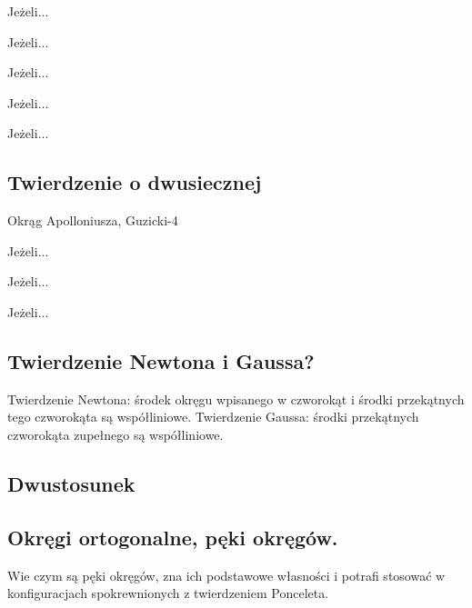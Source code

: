 \begin{definition}
	Jeżeli...
\end{definition}
\begin{proposition}
	Jeżeli...
\end{proposition}
\begin{definition}[oś potęgowa]
	Jeżeli...
\end{definition}
\begin{theorem}[Monge'a]
	Jeżeli...
\end{theorem}
\begin{theorem}[Auberta]
	Jeżeli...
\end{theorem}


\subsection{Twierdzenie o dwusiecznej}
Okrąg Apolloniusza, Guzicki-4

\begin{proposition}
	Jeżeli...
\end{proposition}
\begin{theorem}
	Jeżeli...
\end{theorem}
\begin{definition}
	Jeżeli...
\end{definition}


\subsection{Twierdzenie Newtona i Gaussa?}
Twierdzenie Newtona: środek okręgu wpisanego w czworokąt i środki przekątnych tego czworokąta są współliniowe.
Twierdzenie Gaussa: środki przekątnych czworokąta zupełnego są współliniowe.

\subsection{Dwustosunek}

\subsection{Okręgi ortogonalne, pęki okręgów.}
Wie czym są pęki okręgów, zna ich podstawowe własności i potrafi stosować w konfiguracjach spokrewnionych z twierdzeniem Ponceleta.   


